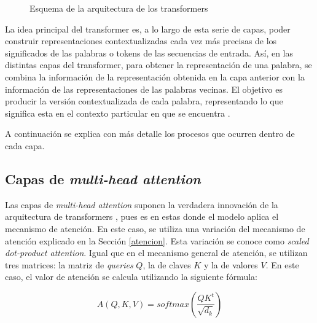 \documentclass[11pt,spanish,listoffigures,listoftables]{tfgetsinf}
\begin{document}
\begin{figure}[h]
    \caption{Esquema de la arquitectura de los transformers}
    \label{fig:transformers}
\end{figure}

La idea principal del transformer es, a lo largo de esta serie de capas, poder construir representaciones contextualizadas cada vez más precisas de los significados de las palabras o tokens de las secuencias de entrada. Así, en las distintas capas del transformer, para obtener la representación de una palabra, se combina la información de la representación obtenida en la capa anterior con la información de las representaciones de las palabras vecinas. El objetivo es producir la versión contextualizada de cada palabra, representando lo que significa esta en el contexto particular en que se encuentra \cite{jurafsky2023speech}.

A continuación se explica con más detalle los procesos que ocurren dentro de cada capa.

\subsection{Capas de \textit{multi-head attention}}
Las capas de \textit{multi-head attention} suponen la verdadera innovación de la arquitectura de transformers \cite{jurafsky2023speech}, pues es en estas donde el modelo aplica el mecanismo de atención.  En este caso, se utiliza una variación del mecanismo de atención explicado en la Sección \ref{atencion}. Esta variación se conoce como \textit{scaled dot-product attention}. Igual que en el mecanismo general de atención, se utilizan tres matrices: la matriz de \textit{queries} $Q$, la de claves $K$ y la de valores $V$. En este caso, el valor de atención se calcula utilizando la siguiente fórmula:

\begin{equation}
A(Q, K, V) = softmax(\frac{QK^t}{\sqrt{d_k}})
\end{equation}
\end{document}
